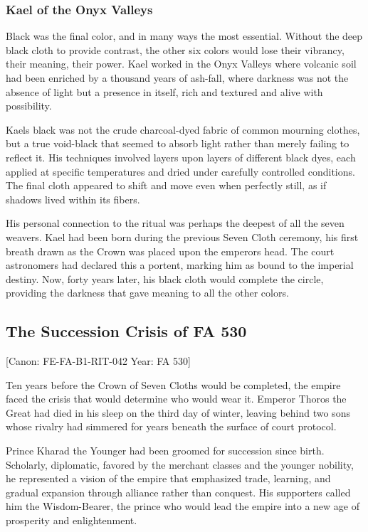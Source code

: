 \subsubsection{Kael of the Onyx Valleys}\label{kael-of-the-onyx-valleys}

Black was the final color, and in many ways the most essential. Without
the deep black cloth to provide contrast, the other six colors would
lose their vibrancy, their meaning, their power. Kael worked in the Onyx
Valleys where volcanic soil had been enriched by a thousand years of
ash-fall, where darkness was not the absence of light but a presence in
itself, rich and textured and alive with possibility.

Kael\textquotesingle s black was not the crude charcoal-dyed fabric of
common mourning clothes, but a true void-black that seemed to absorb
light rather than merely failing to reflect it. His techniques involved
layers upon layers of different black dyes, each applied at specific
temperatures and dried under carefully controlled conditions. The final
cloth appeared to shift and move even when perfectly still, as if
shadows lived within its fibers.

His personal connection to the ritual was perhaps the deepest of all the
seven weavers. Kael had been born during the previous Seven Cloth
ceremony, his first breath drawn as the Crown was placed upon the
emperor\textquotesingle s head. The court astronomers had declared this
a portent, marking him as bound to the imperial destiny. Now, forty
years later, his black cloth would complete the circle, providing the
darkness that gave meaning to all the other colors.

\subsection{The Succession Crisis of FA
530}\label{the-succession-crisis-of-fa-530}

{[}Canon: FE-FA-B1-RIT-042 \textbar{} Year: FA 530{]}

Ten years before the Crown of Seven Cloths would be completed, the
empire faced the crisis that would determine who would wear it. Emperor
Thoros the Great had died in his sleep on the third day of winter,
leaving behind two sons whose rivalry had simmered for years beneath the
surface of court protocol.

Prince Kharad the Younger had been groomed for succession since birth.
Scholarly, diplomatic, favored by the merchant classes and the younger
nobility, he represented a vision of the empire that emphasized trade,
learning, and gradual expansion through alliance rather than conquest.
His supporters called him the Wisdom-Bearer, the prince who would lead
the empire into a new age of prosperity and enlightenment.

